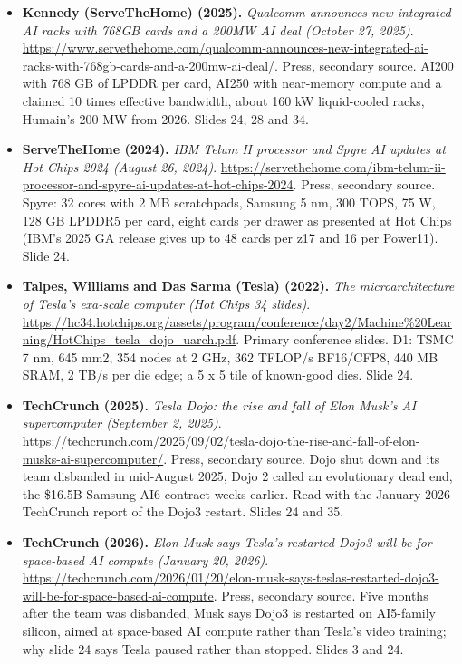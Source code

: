 \documentclass[11pt,letterpaper]{article}
\begin{document}
\begin{itemize}[leftmargin=1.2em,itemsep=3pt]
\item \textbf{Kennedy (ServeTheHome) (2025).} \textit{Qualcomm announces new integrated AI racks with 768GB cards and a 200MW AI deal (October 27, 2025)}. \url{https://www.servethehome.com/qualcomm-announces-new-integrated-ai-racks-with-768gb-cards-and-a-200mw-ai-deal/}. Press, secondary source. AI200 with 768 GB of LPDDR per card, AI250 with near-memory compute and a claimed 10 times effective bandwidth, about 160 kW liquid-cooled racks, Humain's 200 MW from 2026. Slides 24, 28 and 34.
\item \textbf{ServeTheHome (2024).} \textit{IBM Telum II processor and Spyre AI updates at Hot Chips 2024 (August 26, 2024)}. \url{https://servethehome.com/ibm-telum-ii-processor-and-spyre-ai-updates-at-hot-chips-2024}. Press, secondary source. Spyre: 32 cores with 2 MB scratchpads, Samsung 5 nm, 300 TOPS, 75 W, 128 GB LPDDR5 per card, eight cards per drawer as presented at Hot Chips (IBM's 2025 GA release gives up to 48 cards per z17 and 16 per Power11). Slide 24.
\item \textbf{Talpes, Williams and Das Sarma (Tesla) (2022).} \textit{The microarchitecture of Tesla's exa-scale computer (Hot Chips 34 slides)}. \url{https://hc34.hotchips.org/assets/program/conference/day2/Machine%20Learning/HotChips_tesla_dojo_uarch.pdf}. Primary conference slides. D1: TSMC 7 nm, 645 mm2, 354 nodes at 2 GHz, 362 TFLOP/s BF16/CFP8, 440 MB SRAM, 2 TB/s per die edge; a 5 x 5 tile of known-good dies. Slide 24.
\item \textbf{TechCrunch (2025).} \textit{Tesla Dojo: the rise and fall of Elon Musk's AI supercomputer (September 2, 2025)}. \url{https://techcrunch.com/2025/09/02/tesla-dojo-the-rise-and-fall-of-elon-musks-ai-supercomputer/}. Press, secondary source. Dojo shut down and its team disbanded in mid-August 2025, Dojo 2 called an evolutionary dead end, the \$16.5B Samsung AI6 contract weeks earlier. Read with the January 2026 TechCrunch report of the Dojo3 restart. Slides 24 and 35.
\item \textbf{TechCrunch (2026).} \textit{Elon Musk says Tesla's restarted Dojo3 will be for space-based AI compute (January 20, 2026)}. \url{https://techcrunch.com/2026/01/20/elon-musk-says-teslas-restarted-dojo3-will-be-for-space-based-ai-compute}. Press, secondary source. Five months after the team was disbanded, Musk says Dojo3 is restarted on AI5-family silicon, aimed at space-based AI compute rather than Tesla's video training; why slide 24 says Tesla paused rather than stopped. Slides 3 and 24.
\end{itemize}
\end{document}

